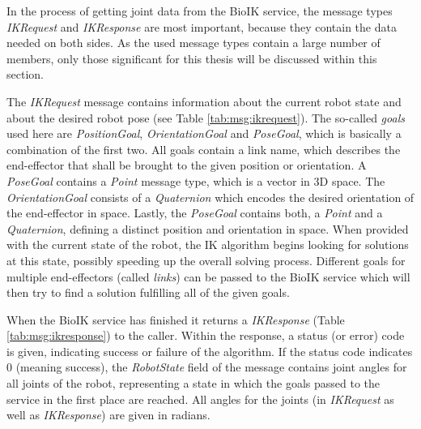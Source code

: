 In the process of getting joint data from the BioIK service, the message types \textit{IKRequest} and \textit{IKResponse} are most important, because they contain the data needed on both sides. As the used message types contain a large number of members, only those significant for this thesis will be discussed within this section.

The \textit{IKRequest} message contains information about the current robot state and about the desired robot pose (see Table \ref{tab:msg:ikrequest}). The so-called \textit{goals} used here are \textit{PositionGoal}, \textit{OrientationGoal} and \textit{PoseGoal}, which is basically a combination of the first two. All goals contain a link name, which describes the end-effector that shall be brought to the given position or orientation. A \textit{PoseGoal} contains a \textit{Point} message type, which is a vector in 3D space. The \textit{OrientationGoal} consists of a \textit{Quaternion} which encodes the desired orientation of the end-effector in space. Lastly, the \textit{PoseGoal} contains both, a \textit{Point} and a \textit{Quaternion}, defining a distinct position and orientation in space. When provided with the current state of the robot, the IK algorithm begins looking for solutions at this state, possibly speeding up the overall solving process. Different goals for multiple end-effectors (called \textit{links}) can be passed to the BioIK service which will then try to find a solution fulfilling all of the given goals.

When the BioIK service has finished it returns a \textit{IKResponse} (Table \ref{tab:msg:ikresponse}) to the caller. Within the response, a status (or error) code is given, indicating success or failure of the algorithm. If the status code indicates 0 (meaning success), the \textit{RobotState} field of the message contains joint angles for all joints of the robot, representing a state in which the goals passed to the service in the first place are reached. All angles for the joints (in \textit{IKRequest} as well as \textit{IKResponse}) are given in radians.


